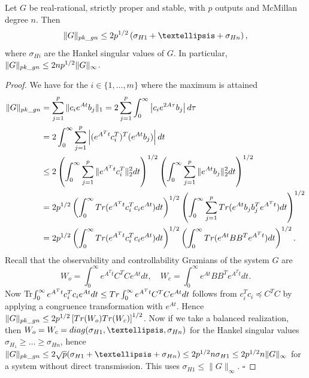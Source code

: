 \documentclass[10pt,a4paper]{amsart}
\begin{document}
\begin{lemma}
\label{sigmas_lemma}
Let $G$ be real-rational, strictly proper and stable, with $p$ outputs and McMillan degree $n$.
Then
\begin{equation}
\label{sigmas}
\|G\|_{\rm pk\_gn} \leq 2{p}^{1/2} \left( \sigma_{H1} + \dots + \sigma_{Hn}  \right), 
\end{equation}
where $\sigma_{Hi}$ are the Hankel singular
values of $G$. In particular, $\|G\|_{\rm pk\_gn} \leq 2n {p}^{1/2} \|G\|_\infty$.
\end{lemma}

\begin{proof}
We have for the $i\in \{1,\dots,m\}$ where the maximum is attained
\begin{align*}
\|G\|_{\rm pk\_gn} &= \sum_{j=1}^p \|c_i e^{At} b_j\|_1 
= 2 \sum_{j=1}^p \int_0^\infty  \left|c_i e^{2A\tau} b_j \right| d\tau \\
&=
2 \int_0^\infty \sum_{j=1}^p \left| (e^{{A^T}t} c_i^T)^T(e^{At}b_j) \right| dt\\
&\leq 2 \left(\int_0^\infty \sum_{j=1}^p \|e^{{A^T} t}c_i^T\|_2^2 dt\right)^{1/2} 
\left( \int_0^\infty \sum_{j=1}^p  \|e^{At}b_j\|_2^2 dt  \right)^{1/2}\\
&= 2p^{1/2} \left( \int_0^\infty  {\rm Tr}( e^{A^Tt}c_i^Tc_ie^{At}) dt \right)^{1/2} \left(  \int_0^\infty \sum_{j=1}^p {\rm Tr} (e^{At}b_jb_j^Te^{A^Tt}) dt\right)^{1/2}\\ 
&= 2 {p}^{1/2}  \left( \int_0^\infty {\rm Tr}( e^{A^Tt}c_i^Tc_ie^{At}) dt \right)^{1/2}
\left(  \int_0^\infty  {\rm Tr} (e^{At}BB^Te^{A^Tt}) dt\right)^{1/2}.%
%
\end{align*} 
%
Recall that
the observability and controllability Gramians of the system $G$
are
$$
W_o = \int_0^\infty e^{A^Tt}C^TC e^{At} dt, \quad W_c = \int_0^\infty e^{At} BB^Te^{A^Tt} dt.
$$
Now  Tr$\int_0^\infty e^{A^Tt}c_i^Tc_ie^{At} dt \leq {\rm Tr}\int_0^\infty e^{A^Tt}C^TCe^{At} dt$ 
follows from $c_i^Tc_i \preceq C^TC$ by applying a congruence
transformation with $e^{At}$.
Hence
$\|G\|_{\rm pk\_gn}  \leq 2{p}^{1/2}\left[ {\rm Tr}(W_o) {\rm Tr}(W_c) \right]^{1/2}$. Now
if we take a balanced realization, then $W_o=W_c = {\rm diag} (\sigma_{H1},\dots,\sigma_{Hn})$ for the Hankel singular
values $\sigma_{H_1} \geq \dots \geq \sigma_{Hn}$, hence 
$
\|G\|_{\rm pk\_gn} \leq 2\sqrt{p} (\sigma_{H1} + \dots + \sigma_{Hn})
\leq 2 p^{1/2} n \sigma_{H1} \leq 2p^{1/2}n \|G\|_\infty$
for a system without direct transmission. This uses $\sigma_{H1} \leq \|G\|_\infty$.
\hfill $\square$
\end{proof}
\end{document}
